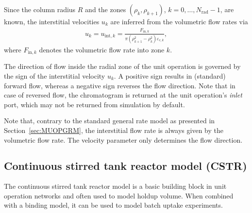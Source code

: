 Since the column radius $R$ and the zones $(\rho_k, \rho_{k+1})$, $k = 0, \dots, N_{\text{rad}} - 1$, are known, the interstitial velocities $u_k$ are inferred from the volumetric flow rates via
\begin{align*}
	u_k = u_{\text{int},k} = \frac{F_{\text{in},k}}{\pi \left( \rho_{k+1}^2 - \rho_k^2 \right) \varepsilon_{c,k}},
\end{align*}
where $F_{\text{in},k}$ denotes the volumetric flow rate into zone $k$.

The direction of flow inside the radial zone of the unit operation is governed by the sign of the interstitial velocity $u_k$.
A positive sign results in (standard) forward flow, whereas a negative sign reverses the flow direction.
Note that in case of reversed flow, the chromatogram is returned at the unit operation's \emph{inlet} port, which may not be returned from simulation by default.

Note that, contrary to the standard general rate model as presented in Section~\ref{sec:MUOPGRM}, the interstitial flow rate is always given by the volumetric flow rate.
The velocity parameter only determines the flow direction.

\subsection{Continuous stirred tank reactor model (CSTR)}\label{sec:MUOPCSTR}

The continuous stirred tank reactor model  is a basic building block in unit operation networks and often used to model holdup volume.
When combined with a binding model, it can be used to model batch uptake experiments.

